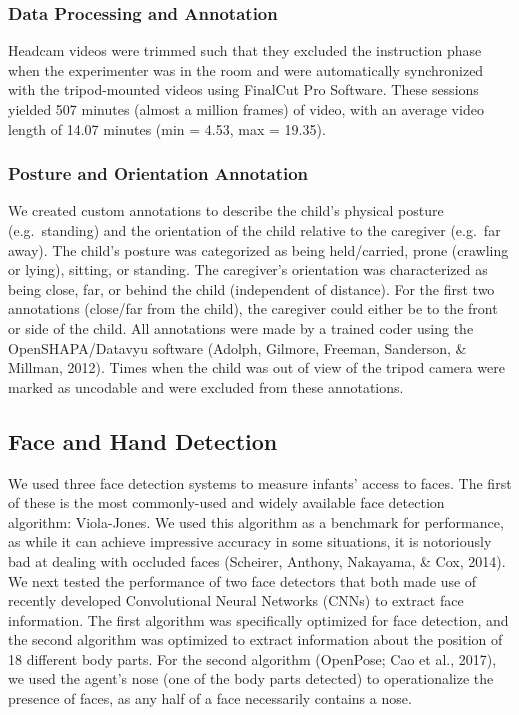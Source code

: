 \documentclass[english,man,floatsintext,draftall]{apa6}
\begin{document}
\subsubsection{Data Processing and
Annotation}\label{data-processing-and-annotation}

Headcam videos were trimmed such that they excluded the instruction
phase when the experimenter was in the room and were automatically
synchronized with the tripod-mounted videos using FinalCut Pro Software.
These sessions yielded 507 minutes (almost a million frames) of video,
with an average video length of 14.07 minutes (min = 4.53, max = 19.35).

\subsubsection{Posture and Orientation
Annotation}\label{posture-and-orientation-annotation}

We created custom annotations to describe the child's physical posture
(e.g.~standing) and the orientation of the child relative to the
caregiver (e.g.~far away). The child's posture was categorized as being
held/carried, prone (crawling or lying), sitting, or standing. The
caregiver's orientation was characterized as being close, far, or behind
the child (independent of distance). For the first two annotations
(close/far from the child), the caregiver could either be to the front
or side of the child. All annotations were made by a trained coder using
the OpenSHAPA/Datavyu software (Adolph, Gilmore, Freeman, Sanderson, \&
Millman, 2012). Times when the child was out of view of the tripod
camera were marked as uncodable and were excluded from these
annotations.

\subsection{Face and Hand Detection}\label{face-and-hand-detection}

We used three face detection systems to measure infants' access to
faces. The first of these is the most commonly-used and widely available
face detection algorithm: Viola-Jones. We used this algorithm as a
benchmark for performance, as while it can achieve impressive accuracy
in some situations, it is notoriously bad at dealing with occluded faces
(Scheirer, Anthony, Nakayama, \& Cox, 2014). We next tested the
performance of two face detectors that both made use of recently
developed Convolutional Neural Networks (CNNs) to extract face
information. The first algorithm was specifically optimized for face
detection, and the second algorithm was optimized to extract information
about the position of 18 different body parts. For the second algorithm
(OpenPose; Cao et al., 2017), we used the agent's nose (one of the body
parts detected) to operationalize the presence of faces, as any half of
a face necessarily contains a nose.
\end{document}
